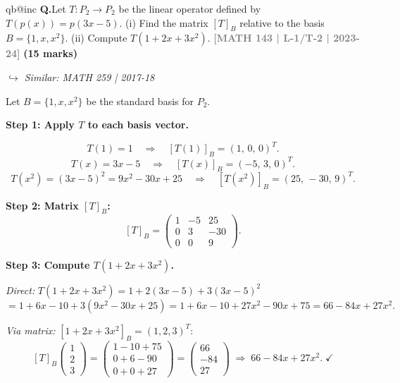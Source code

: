 \documentclass[12pt,a3paper]{article}
\makeatletter
\newcommand{\yr}[1]{\hfill\textcolor{gray}{\small\textbf{[#1]}}}
\newcommand{\mk}[1]{\textcolor{orange!70!black}{\small\textbf{(#1 marks)}}}
\newcommand{\variant}[1]{\par\vspace{1pt}\textcolor{blue!50!black}%
  {\footnotesize\textit{$\hookrightarrow$ Similar: #1}}}
\newcounter{qnum}
\newcommand{\Q}[1]{%
  \csname qb@inc\endcsname
  \needspace{4\baselineskip}
  \refstepcounter{qnum}
  \vspace{6pt}
  \noindent\textbf{Q\theqnum.}\enspace #1\par
}
\makeatother
\begin{document}
\Q{Let $T: P_2 \to P_2$ be the linear operator defined by $T(p(x)) = p(3x-5)$. (i) Find the matrix $[T]_B$ relative to the basis $B = \{1, x, x^2\}$. (ii) Compute $T(1 + 2x + 3x^2)$.
\yr{MATH 143 | L-1/T-2 | 2023-24} \mk{15}
\variant{MATH 259 | 2017-18}}
\begin{tcolorbox}[enhanced,breakable,
  colback=cF!4,colframe=cF,boxrule=0.8pt,arc=5pt,
  title={\textbf{Answer --- $T:P_2\to P_2$, $T(p(x))=p(3x-5)$: Matrix $[T]_B$ \& Computation}},
  fonttitle=\bfseries\color{white},colbacktitle=cF]

Let $B=\{1,x,x^2\}$ be the standard basis for $P_2$.

\textbf{Step 1: Apply $T$ to each basis vector.}

\[
T(1)=1\quad\Rightarrow\quad[T(1)]_B=(1,\,0,\,0)^T.
\]
\[
T(x)=3x-5\quad\Rightarrow\quad[T(x)]_B=(-5,\,3,\,0)^T.
\]
\[
T(x^2)=(3x-5)^2=9x^2-30x+25\quad\Rightarrow\quad[T(x^2)]_B=(25,\,-30,\,9)^T.
\]

\textbf{Step 2: Matrix $[T]_B$:}
\[
[T]_B=\begin{pmatrix}1&-5&25\\0&3&-30\\0&0&9\end{pmatrix}.
\]

\textbf{Step 3: Compute $T(1+2x+3x^2)$.}

\textit{Direct:} $T(1+2x+3x^2)=1+2(3x-5)+3(3x-5)^2$
\[
=1+6x-10+3(9x^2-30x+25)=1+6x-10+27x^2-90x+75=\boxed{66-84x+27x^2}.
\]

\textit{Via matrix:} $[1+2x+3x^2]_B=(1,2,3)^T$:
\[
[T]_B\begin{pmatrix}1\\2\\3\end{pmatrix}=\begin{pmatrix}1-10+75\\0+6-90\\0+0+27\end{pmatrix}=\begin{pmatrix}66\\-84\\27\end{pmatrix}
\;\Rightarrow\; 66-84x+27x^2.\;\checkmark
\]

\end{tcolorbox}
\end{document}
